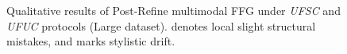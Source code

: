 \begin{figure}[tp]
    \caption{
        Qualitative results of Post-Refine multimodal FFG under \textit{UFSC} and \textit{UFUC} protocols
        (Large dataset). 
        \textcolor{ex2figure_red}{\fbox{\rule{0pt}{4pt}\rule{4pt}{0pt}}} denotes local slight structural mistakes, 
        and \textcolor{ex2figure_blue}{\fbox{\rule{0pt}{4pt}\rule{4pt}{0pt}}} marks stylistic drift.
    }
    \label{fig: supple_main2_large_post}

\end{figure}














